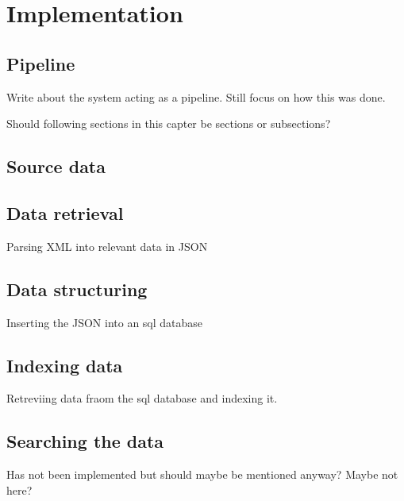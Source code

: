 
\chapter{Implementation}

\section{Pipeline}

Write about the system acting as a pipeline.
Still focus on how this was done.

Should following sections in this capter be sections or subsections?

\section{Source data}


\section{Data retrieval}

Parsing XML into relevant data in JSON

\section{Data structuring}

Inserting the JSON into an sql database

\section{Indexing data}

Retreviing data fraom the sql database and indexing it.

\section{Searching the data}

Has not been implemented but should maybe be mentioned anyway? Maybe not here?


\cleardoublepage
